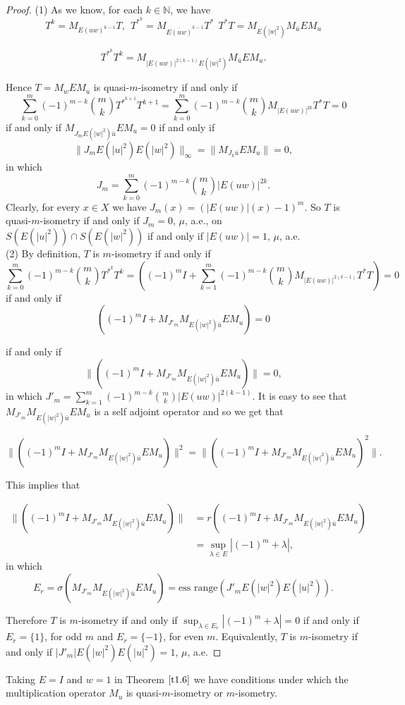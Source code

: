 \documentclass{amsart}
\theoremstyle{definition}\newtheorem{defn}[thm]{Definition}
\theoremstyle{remark}
\numberwithin{equation}{section}
\begin{document}
\begin{proof}
(1) 
As we know, for each $k\in \mathbb{N}$, we have 
$$T^k=M_{E(uw)^{k-1}}T, \ \ T^{*^k}=M_{\overline{E(uw)}^{k-1}}T^* \ \ T^*T=M_{E(|w|^2)}M_{\bar{u}}EM_u$$

$$T^{*^k}T^k=M_{|E(uw)|^{2(k-1)}E(|w|^2)}M_{\bar{u}}EM_u.$$

Hence $T=M_wEM_u$ is quasi-$m$-isometry if and only if
$$\sum_{k=0}^{m}(-1)^{m-k}\binom{m}{k}T^{*^{k+1}}T^{k+1}=\sum_{k=0}^{m}(-1)^{m-k}\binom{m}{k}M_{|E(uw)|^{2k}}T^*T=0$$
if and only if $ M_{J_mE(|w|^2)\bar{u}}EM_u=0$
if and only if $$\|J_mE(|u|^2)E(|w|^2)\|_{\infty}=\|M_{J_k\bar{u}}EM_u\|=0,$$
in which $$J_m=\sum_{k=0}^{m}(-1)^{m-k}\binom{m}{k}|E(uw)|^{2k}.$$ 
Clearly, for every $x\in X$ we have $J_m(x)=(|E(uw)|(x)-1)^m$. 
So $T$ is quasi-$m$-isometry if and only if $J_m=0$, $\mu$, a.e., on $S(E(|u|^2))\cap S(E(|w|^2))$ if and only if $|E(uw)|=1$, $\mu$, a.e.\\ 

(2) By definition, $T$ is $m$-isometry if and only if
$$\sum_{k=0}^{m}(-1)^{m-k}\binom{m}{k}T^{*^{k}}T^{k}=((-1)^mI+\sum_{k=1}^{m}(-1)^{m-k}\binom{m}{k}M_{|E(uw)|^{2(k-1)}}T^*T)=0$$
if and only if
$$((-1)^mI+M_{J'_m}M_{E(|w|^2)\bar{u}}EM_u)=0$$
 
if and only if 
$$\|((-1)^mI+M_{J'_m}M_{E(|w|^2)\bar{u}}EM_u)\|=0,$$ 
in which 
$J'_m=\sum_{k=1}^{m}(-1)^{m-k}\binom{m}{k}|E(uw)|^{2(k-1)}$.
 It is easy to see that $M_{J'_m}M_{E(|w|^2)\bar{u}}EM_u$ is a self adjoint operator and so we get that
 
$$\|((-1)^mI+M_{J'_m}M_{E(|w|^2)\bar{u}}EM_u)\|^2=\|((-1)^mI+M_{J'_m}M_{E(|w|^2)\bar{u}}EM_u)^2\|.$$

This implies that 

\begin{align*}
\|((-1)^mI+M_{J'_m}M_{E(|w|^2)\bar{u}}EM_u)\|&=r((-1)^mI+M_{J'_m}M_{E(|w|^2)\bar{u}}EM_u)\\
&=\sup_{\lambda\in E}|(-1)^m+\lambda|,
\end{align*}
 in which 
 $$E_r=\sigma(M_{J'_m}M_{E(|w|^2)\bar{u}}EM_u)=\text{ess \ range}(J'_mE(|w|^2)E(|u|^2)).$$
 
 Therefore $T$ is $m$-isometry if and only if $\sup_{\lambda\in E_r}|(-1)^m+\lambda|=0$ if and only if $E_r=\{1\}$, for odd $m$ and $E_r=\{-1\}$, for even $m$. Equivalently, $T$ is $m$-isometry if and only if $|J'_m|E(|w|^2)E(|u|^2)=1$, $\mu$, a.e.
\end{proof}

Taking $E=I$ and $w=1$ in Theorem $\ref{t1.6}$ we have conditions under which the multiplication operator $M_u$ is quasi-$m$-isometry or $m$-isometry.
 
\end{document}
